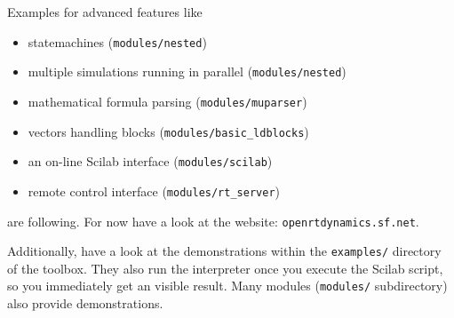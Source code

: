 \documentclass[serif,9pt,xcolor=dvipsnames]{beamer}
\begin{document}
\begin{frame}
Examples for advanced features like 

  \begin{itemize}
\item statemachines (\texttt{modules/nested})
\item multiple simulations running in parallel (\texttt{modules/nested})
\item mathematical formula parsing (\texttt{modules/muparser})
\item vectors handling blocks (\texttt{modules/basic\_ldblocks})
\item an on-line Scilab interface (\texttt{modules/scilab})
\item remote control interface (\texttt{modules/rt\_server})
  \end{itemize}



are following. For now have a look at the website: \texttt{openrtdynamics.sf.net}.

\vspace{6mm}


  Additionally, have a look at the demonstrations within the \texttt{examples/} directory of the toolbox. They also run the interpreter once you execute the Scilab script, so you immediately get an visible result. Many modules (\texttt{modules/} subdirectory) also provide demonstrations.

\end{frame}
\end{document}
